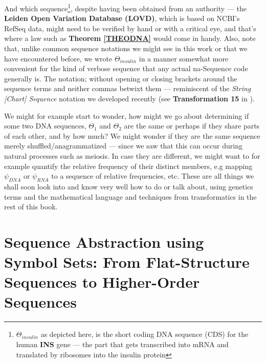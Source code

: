 \documentclass[a4paper, 18pt]{book} %
\begin{document}
\vspace{2em}

And which sequence\footnote{$\Theta_{insulin}$ as depicted here, is the short coding DNA sequence (CDS) for the human \textbf{INS} gene --- the part that gets transcribed into mRNA and translated by ribosomes into the insulin protein\cite{copilot_dna_assistant}}, despite having been obtained from an authority --- the \textbf{Leiden Open Variation Database (LOVD)}, which is based on NCBI's RefSeq data\cite{RefSeq}, might need to be verified by hand or with a critical eye, and that's where a law such as \textbf{Theorem \ref{THEODNA}} would come in handy. Also, note that, unlike common sequence notations we might see in this work or that we have encountered before, we wrote $\Theta_{insulin}$ in a manner somewhat more convenient for the kind of verbose sequence that any actual na-Sequence code generally is. The notation; without opening or closing brackets around the sequence terms and neither commas betwixt them --- reminiscent of the \textit{String [Chart] Sequence} notation we developed recently (see \textbf{Transformation 15} in \cite{transformatics}).

We might for example start to wonder, how might we go about determining if some two DNA sequences, $\Theta_1$ and $\Theta_2$ are the same or perhaps if they share parts of each other, and by how much? We might wonder if they are the same sequence merely shuffled/anagrammatized --- since we saw that this can occur during natural processes such as meiosis\cite{genomics2025origin}. In case they are different, we might want to for example quantify the relative frequency of their distinct members, e.g mapping $\psi_{DNA}$ or $\psi_{RNA}$ to a sequence of relative frequencies, etc. These are all things we shall soon look into and know very well how to do or talk about, using genetics terms and the mathematical language and techniques from transformatics in the rest of this book.

\chapter{Sequence Abstraction using Symbol Sets: From Flat-Structure Sequences to Higher-Order Sequences}
\label{SECSEQAB}
\end{document}
